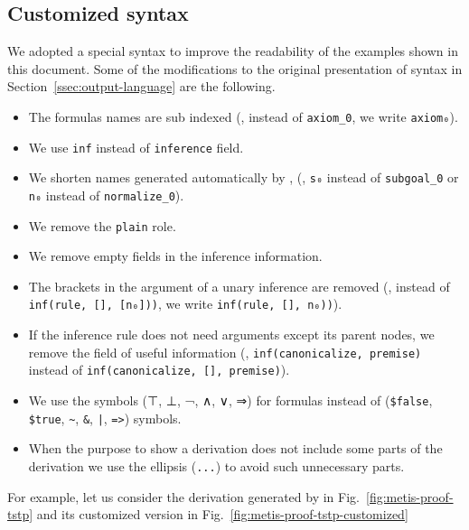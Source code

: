 \documentclass[../main.tex]{subfiles}
\begin{document}
\clearpage

\begin{subappendices}

\renewcommand{\thesection}{\Alph{section}}%

\section{Customized \TSTP syntax}
\label{app:tstp-syntax}

We adopted a special \TSTP syntax to improve the readability of the \TSTP
examples shown in this document. Some of the modifications to the original
presentation of \TSTP syntax in Section~\ref{ssec:output-language} are the
following.

\begin{itemize}
  \item The formulas names are sub indexed (\eg, instead of \verb!axiom_0!,
  we write \verb!axiom₀!).
  \item We use \verb!inf! instead of \verb!inference! field.
  \item We shorten names generated automatically by \Metis, (\eg,
\verb!s₀! instead of \verb!subgoal_0! or \verb!n₀!
instead of \verb!normalize_0!).
  \item We remove the \verb!plain! role.
  \item We remove empty fields in the inference information.
  \item The brackets in the argument of a unary inference are removed (\eg,
instead of \verb!inf(rule, [], [n₀]))!, we write
\verb!inf(rule, [], n₀))!).
  \item If the inference rule does not need arguments except its parent nodes,
  we remove the field of useful information (\eg,
 \verb!inf(canonicalize, premise)! instead of
 \verb!inf(canonicalize, [], premise)!).
  \item We use the symbols (⊤, ⊥, ¬, ∧, ∨, ⇒) for formulas instead of
  (\verb!$false!, \verb!$true!, \verb!~!, \verb!&!, \verb!|!, \verb!=>!) \TPTP symbols.
  \item When the purpose to show a \TSTP derivation does not include
  some parts of the derivation we use the ellipsis (\verb!...!) to avoid
  such unnecessary parts.
\end{itemize}

For example, let us consider the \TSTP derivation generated by \Metis
in Fig.~\ref{fig:metis-proof-tstp} and its customized version in
Fig.~\ref{fig:metis-proof-tstp-customized}


\end{subappendices}
\end{document}

